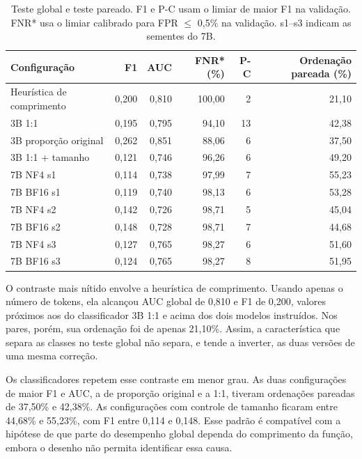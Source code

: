 \begin{table}[H]
    \centering
    \caption{Teste global e teste pareado. F1 e P-C usam o limiar de maior F1 na validação. FNR* usa o limiar calibrado para FPR $\leq$ 0,5\% na validação. s1--s3 indicam as sementes do 7B.}
    \label{tab:global}
    \footnotesize
    \begin{tabular}{lrrrrr}
        \toprule
        \textbf{Configuração} & \textbf{F1} & \textbf{AUC} & \textbf{FNR* (\%)} & \textbf{P-C} & \textbf{Ordenação pareada (\%)} \\
        \midrule
        Heurística de comprimento & 0,200 & 0,810 & 100,00 & 2 & 21,10 \\
        3B 1:1 & 0,195 & 0,795 & 94,10 & 13 & 42,38 \\
        3B proporção original & 0,262 & 0,851 & 88,06 & 6 & 37,50 \\
        3B 1:1 + tamanho & 0,121 & 0,746 & 96,26 & 6 & 49,20 \\
        7B NF4 s1 & 0,114 & 0,738 & 97,99 & 7 & 55,23 \\
        7B BF16 s1 & 0,119 & 0,740 & 98,13 & 6 & 53,28 \\
        7B NF4 s2 & 0,142 & 0,726 & 98,71 & 5 & 45,04 \\
        7B BF16 s2 & 0,148 & 0,728 & 98,71 & 7 & 44,68 \\
        7B NF4 s3 & 0,127 & 0,765 & 98,27 & 6 & 51,60 \\
        7B BF16 s3 & 0,124 & 0,765 & 98,27 & 8 & 51,95 \\
        \bottomrule
    \end{tabular}
\end{table}

O contraste mais nítido envolve a heurística de comprimento. Usando apenas o número de tokens, ela alcançou AUC global de 0,810 e F1 de 0,200, valores próximos aos do classificador 3B 1:1 e acima dos dois modelos instruídos. Nos pares, porém, sua ordenação foi de apenas 21,10\%. Assim, a característica que separa as classes no teste global não separa, e tende a inverter, as duas versões de uma mesma correção.

Os classificadores repetem esse contraste em menor grau. As duas configurações de maior F1 e AUC, a de proporção original e a 1:1, tiveram ordenações pareadas de 37,50\% e 42,38\%. As configurações com controle de tamanho ficaram entre 44,68\% e 55,23\%, com F1 entre 0,114 e 0,148. Esse padrão é compatível com a hipótese de que parte do desempenho global dependa do comprimento da função, embora o desenho não permita identificar essa causa.

